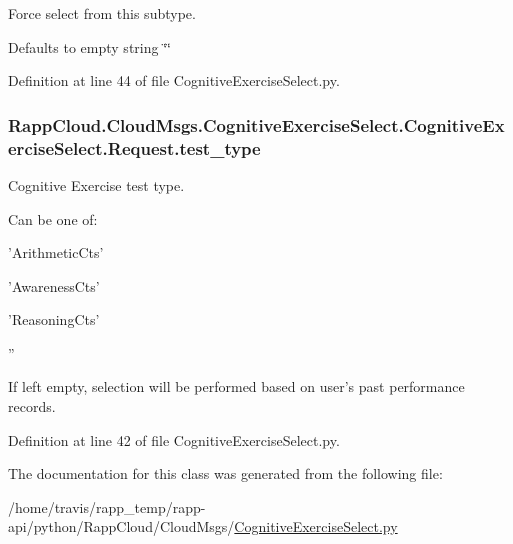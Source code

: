 Force select from this subtype. 

Defaults to empty string \char`\"{}\char`\"{} 

Definition at line 44 of file Cognitive\-Exercise\-Select.\-py.

\hypertarget{classRappCloud_1_1CloudMsgs_1_1CognitiveExerciseSelect_1_1CognitiveExerciseSelect_1_1Request_a3b20425469cab1bed890005026c4c4af}{
\subsubsection[{test\-\_\-type}]{\setlength{\rightskip}{0pt plus 5cm}Rapp\-Cloud.\-Cloud\-Msgs.\-Cognitive\-Exercise\-Select.\-Cognitive\-Exercise\-Select.\-Request.\-test\-\_\-type}}\label{classRappCloud_1_1CloudMsgs_1_1CognitiveExerciseSelect_1_1CognitiveExerciseSelect_1_1Request_a3b20425469cab1bed890005026c4c4af}


Cognitive Exercise test type. 

Can be one of\-:
\begin{DoxyItemize}
\item 'Arithmetic\-Cts'
\item 'Awareness\-Cts'
\item 'Reasoning\-Cts'
\item ''
\end{DoxyItemize}

If left empty, selection will be performed based on user's past performance records. 

Definition at line 42 of file Cognitive\-Exercise\-Select.\-py.



The documentation for this class was generated from the following file\-:\begin{DoxyCompactItemize}
\item 
/home/travis/rapp\-\_\-temp/rapp-\/api/python/\-Rapp\-Cloud/\-Cloud\-Msgs/\hyperlink{CognitiveExerciseSelect_8py}{Cognitive\-Exercise\-Select.\-py}\end{DoxyCompactItemize}
